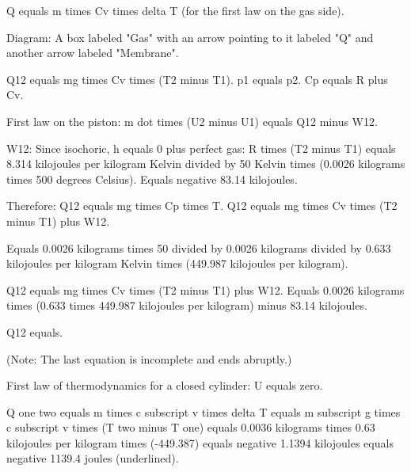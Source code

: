 Q equals m times Cv times delta T (for the first law on the gas side).  

Diagram:  
A box labeled "Gas" with an arrow pointing to it labeled "Q" and another arrow labeled "Membrane".  

Q12 equals mg times Cv times (T2 minus T1).  
p1 equals p2.  
Cp equals R plus Cv.  

First law on the piston:  
m dot times (U2 minus U1) equals Q12 minus W12.  

W12: Since isochoric, h equals 0 plus perfect gas:  
R times (T2 minus T1) equals 8.314 kilojoules per kilogram Kelvin divided by 50 Kelvin times (0.0026 kilograms times 500 degrees Celsius).  
Equals negative 83.14 kilojoules.  

Therefore:  
Q12 equals mg times Cp times T.  
Q12 equals mg times Cv times (T2 minus T1) plus W12.  

Equals 0.0026 kilograms times 50 divided by 0.0026 kilograms divided by 0.633 kilojoules per kilogram Kelvin times (449.987 kilojoules per kilogram).  

Q12 equals mg times Cv times (T2 minus T1) plus W12.  
Equals 0.0026 kilograms times (0.633 times 449.987 kilojoules per kilogram) minus 83.14 kilojoules.  

Q12 equals.  

(Note: The last equation is incomplete and ends abruptly.)

First law of thermodynamics for a closed cylinder:  
U equals zero.  

Q one two equals m times c subscript v times delta T  
equals m subscript g times c subscript v times (T two minus T one)  
equals 0.0036 kilograms times 0.63 kilojoules per kilogram times (-449.387)  
equals negative 1.1394 kilojoules equals negative 1139.4 joules (underlined).